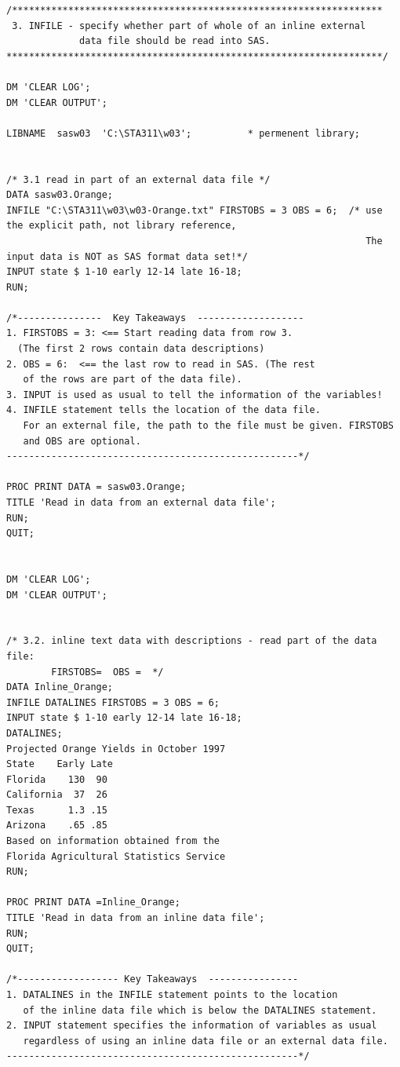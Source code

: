 \documentclass[
]{book}
\begin{document}
\begin{verbatim}
/******************************************************************
 3. INFILE - specify whether part of whole of an inline external
             data file should be read into SAS.
*******************************************************************/

DM 'CLEAR LOG';
DM 'CLEAR OUTPUT';

LIBNAME  sasw03  'C:\STA311\w03';          * permenent library;


/* 3.1 read in part of an external data file */
DATA sasw03.Orange;
INFILE "C:\STA311\w03\w03-Orange.txt" FIRSTOBS = 3 OBS = 6;  /* use the explicit path, not library reference, 
                                                                The input data is NOT as SAS format data set!*/
INPUT state $ 1-10 early 12-14 late 16-18;
RUN;

/*---------------  Key Takeaways  -------------------
1. FIRSTOBS = 3: <== Start reading data from row 3. 
  (The first 2 rows contain data descriptions)
2. OBS = 6:  <== the last row to read in SAS. (The rest
   of the rows are part of the data file).
3. INPUT is used as usual to tell the information of the variables!
4. INFILE statement tells the location of the data file. 
   For an external file, the path to the file must be given. FIRSTOBS
   and OBS are optional.
----------------------------------------------------*/

PROC PRINT DATA = sasw03.Orange;
TITLE 'Read in data from an external data file';
RUN;
QUIT;


DM 'CLEAR LOG';
DM 'CLEAR OUTPUT';


/* 3.2. inline text data with descriptions - read part of the data file: 
        FIRSTOBS=  OBS =  */
DATA Inline_Orange;
INFILE DATALINES FIRSTOBS = 3 OBS = 6;
INPUT state $ 1-10 early 12-14 late 16-18;
DATALINES;
Projected Orange Yields in October 1997
State    Early Late
Florida    130  90
California  37  26
Texas      1.3 .15
Arizona    .65 .85
Based on information obtained from the
Florida Agricultural Statistics Service
RUN;

PROC PRINT DATA =Inline_Orange;
TITLE 'Read in data from an inline data file';
RUN;
QUIT;

/*------------------ Key Takeaways  ----------------
1. DATALINES in the INFILE statement points to the location 
   of the inline data file which is below the DATALINES statement.
2. INPUT statement specifies the information of variables as usual 
   regardless of using an inline data file or an external data file.
----------------------------------------------------*/




\end{verbatim}
\end{document}
